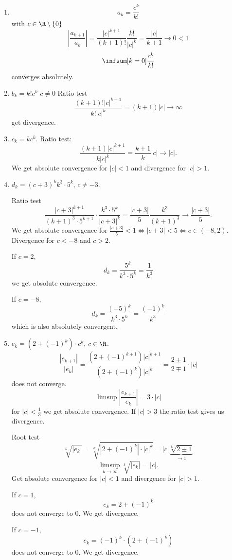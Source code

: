 \documentclass[10pt, a4paper]{article}
\begin{document}
\begin{example}
    \begin{enumerate}[label = (\alph*)]
        \item 
        \[
        a_k = \frac{c ^ k}{k!}
        \]
        with $c \in \R\setminus\{0\}$
        \[
        \left|\frac{a_{k + 1}}{a_k}\right| = \frac{|c| ^ {k + 1}}{(k + 1)!}\frac{k!}{|c| ^ k} = \frac{|c|}{k + 1} \to 0 < 1
        \]
        \[
        \infsum[k = 0]\frac{c ^ k}{k!}
        \]
        converges absolutely.
        \item $b_k = k!c ^ k$ $c \neq 0$
        Ratio test
        \[
        \frac{(k + 1)!|c| ^ {k + 1}}{k!|c| ^ k} = (k + 1)|c| \to \infty
        \]
        get divergence.
        \item 
        $c_k = kc ^ k$.
        Ratio test:
        \[
        \frac{(k + 1)|c| ^ {k + 1}}{k|c| ^ k} = \frac{k + 1}{k}|c| \to |c|.
        \]
        We get absolute convergence for $|c| < 1$ and divergence for $|c| > 1$.
        \item $d_k = {(c + 3) ^ k}{k ^ 3 \cdot 5 ^ k}$,
        $c \neq -3$.

        Ratio test
        \[
        \frac{|c + 3| ^ {k + 1}}{(k + 1) ^ 3\cdot 5 ^ {k + 1}} \cdot \frac{k ^ 3 \cdot 5 ^ k}{|c + 3| ^ k} = \frac{|c + 3|}{5}\frac{k ^ 3}{(k + 1) ^ 3} \to \frac{|c + 3|}{5}.
        \]
        We get absolute convergence for $\frac{|c + 3|}{5} < 1 \iff |c + 3| < 5 \iff c \in (-8, 2)$.
        Divergence for $c < -8$ and $c > 2$.
        
        If $c = 2$,
        \[
        d_k = \frac{5 ^ k}{k ^ 3 \cdot 5 ^ k} = \frac{1}{k ^ 3}
        \]
        we get absolute convergence.

        If $c = -8$,
        \[
        d_k = \frac{(-5) ^ k}{k ^ 3 \cdot 5 ^ k} = \frac{(-1) ^ k}{k ^ 3}
        \]
        which is also absolutely convergent.
        \item $e_k = (2 + (-1) ^ k) \cdot c ^ k$,
        $c \in \R$.
        \[
        \frac{|e_{k + 1}|}{|e_k|} = \frac{(2 + (-1) ^ {k + 1})|c| ^ {k + 1}}{(2 + (-1) ^ k)|c| ^ k} = \frac{2 \pm 1}{2 \mp 1}\cdot |c|
        \]
        does not converge.
        \[
        \limsup\left|\frac{e_{k + 1}}{e_k}\right| = 3\cdot|c|
        \]
        for $|c| < \frac{1}{3}$ we get absolute convergence.
        If $|c| > 3$ the ratio test gives us divergence.

        Root test 
        \[
        \sqrt[k]{|e_k|} = \sqrt[k]{|2 + (-1) ^ k| \cdot |c| ^ k} = |c|\underbrace{\sqrt[k]{2 \pm 1}}_{\to 1}
        \]
        \[
        \limsup_{k \to \infty}\sqrt[k]{|e_k|} = |c|.
        \]
        Get absolute convergence for $|c| < 1$ and divergence for $|c| > 1$.

        If $c = 1$,
        \[
        e_k = 2 + (-1) ^ k
        \]
        does not converge to $0$.
        We get divergence.

        If $c = -1$,
        \[
        e_k = (-1) ^ k \cdot (2 + (-1) ^ k)
        \]
        does not converge to $0$.
        We get divergence.
    \end{enumerate}
\end{example}
\end{document}
